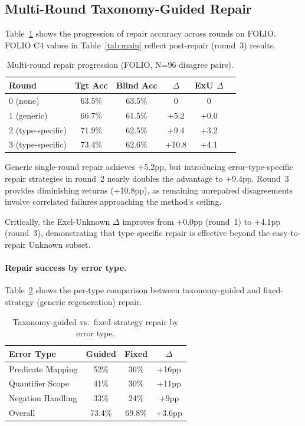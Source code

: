\documentclass[11pt,a4paper]{article}
\begin{document}
\subsection{Multi-Round Taxonomy-Guided Repair}
\label{sec:repair}

Table~\ref{tab:repair} shows the progression of repair accuracy across rounds on FOLIO. FOLIO C4 values in Table~\ref{tab:main} reflect post-repair (round~3) results.

\begin{table}[t]
\centering
\small
\caption{Multi-round repair progression (FOLIO, N=96 disagree pairs).}
\label{tab:repair}
\begin{tabular}{@{}lccccc@{}}
\toprule
\textbf{Round} & \textbf{Tgt Acc} & \textbf{Blind Acc} & \textbf{$\Delta$} & \textbf{ExU $\Delta$} \\
\midrule
0 (none) & 63.5\% & 63.5\% & 0 & 0 \\
1 (generic) & 66.7\% & 61.5\% & +5.2 & +0.0 \\
2 (type-specific) & 71.9\% & 62.5\% & +9.4 & +3.2 \\
3 (type-specific) & 73.4\% & 62.6\% & +10.8 & +4.1 \\
\bottomrule
\end{tabular}
\end{table}

Generic single-round repair achieves +5.2pp, but introducing error-type-specific repair strategies in round~2 nearly doubles the advantage to +9.4pp. Round~3 provides diminishing returns (+10.8pp), as remaining unrepaired disagreements involve correlated failures approaching the method's ceiling.

Critically, the Excl-Unknown $\Delta$ improves from +0.0pp (round~1) to +4.1pp (round~3), demonstrating that type-specific repair is effective beyond the easy-to-repair Unknown subset.

\paragraph{Repair success by error type.}
Table~\ref{tab:repair-type} shows the per-type comparison between taxonomy-guided and fixed-strategy (generic regeneration) repair.

\begin{table}[t]
\centering
\small
\caption{Taxonomy-guided vs.\ fixed-strategy repair by error type.}
\label{tab:repair-type}
\begin{tabular}{@{}lccc@{}}
\toprule
\textbf{Error Type} & \textbf{Guided} & \textbf{Fixed} & \textbf{$\Delta$} \\
\midrule
Predicate Mapping & 52\% & 36\% & +16pp \\
Quantifier Scope & 41\% & 30\% & +11pp \\
Negation Handling & 33\% & 24\% & +9pp \\
\midrule
Overall & 73.4\% & 69.8\% & +3.6pp \\
\bottomrule
\end{tabular}
\end{table}
\end{document}
